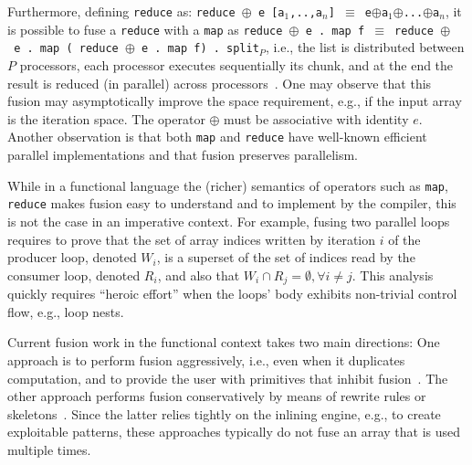 \documentclass{sigplanconf}  %
\newcommand{\emp}[1]{\textcolor{DikuRed}{ #1}}
\begin{document}
Furthermore, defining {\tt reduce} as: 
{\tt reduce $\oplus$ e [a$_1$,..,a$_n$] $\equiv$ e$\oplus$a$_1$$\oplus$...$\oplus$a$_n$},
it is possible to fuse a {\tt reduce} with a {\tt map} as
{\tt reduce~$\oplus$~e~.~map~f~$\equiv$~reduce~$\oplus$~e~.~map~(\emp{reduce~$\oplus$~e .~map~f}) . split$_P$},
i.e., the list is distributed between $P$ processors, each processor executes \emp{sequentially} 
its chunk, and at the end the result is reduced (in parallel) across processors~\cite{BirdListTh}.
One may observe that this fusion may asymptotically improve the space requirement, e.g.,
if the input array is the iteration space.   The operator $\oplus$ must be associative with identity $e$.
%
Another observation is that both {\tt map} and {\tt reduce} have well-known 
efficient parallel implementations and that fusion preserves parallelism. 

While in a functional language the (richer) semantics of operators
such as {\tt map}, {\tt reduce} makes fusion easy to understand and to implement 
by the compiler, this is not the case in an imperative context.
For example, fusing two   %
parallel loops requires to prove that the set of array indices 
written by iteration $i$ of the producer loop, denoted $W_i$, is a 
superset of the set of indices read by the consumer loop, denoted $R_i$, and also
that $W_i \cap R_j = \emptyset, \forall i \neq j$.
%
This analysis quickly requires ``heroic effort'' when the loops' 
body exhibits non-trivial control flow, e.g., loop nests.

Current fusion work in the functional context takes two main directions:
One approach is to perform fusion aggressively, i.e., even when it duplicates
computation, and to provide the user with primitives that inhibit 
fusion~\cite{keller2010regular,claessen2012expressive}.
The other approach performs fusion conservatively by means of rewrite 
rules or skeletons~\cite{jones2001playing,chakravarty2007data,bergstrom2012nested}.
Since the latter relies tightly on the inlining engine, e.g., to create exploitable 
patterns, these approaches typically do not fuse an array that is used multiple times.
\end{document}
